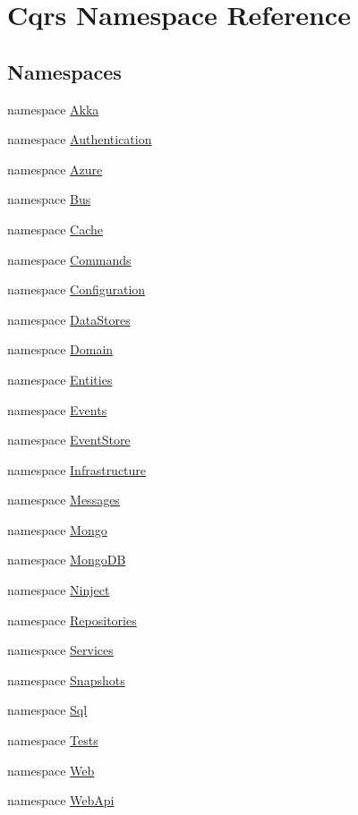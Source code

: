 \hypertarget{namespaceCqrs}{}\section{Cqrs Namespace Reference}
\label{namespaceCqrs}
\subsection*{Namespaces}
\begin{DoxyCompactItemize}
\item 
namespace \hyperlink{namespaceCqrs_1_1Akka}{Akka}
\item 
namespace \hyperlink{namespaceCqrs_1_1Authentication}{Authentication}
\item 
namespace \hyperlink{namespaceCqrs_1_1Azure}{Azure}
\item 
namespace \hyperlink{namespaceCqrs_1_1Bus}{Bus}
\item 
namespace \hyperlink{namespaceCqrs_1_1Cache}{Cache}
\item 
namespace \hyperlink{namespaceCqrs_1_1Commands}{Commands}
\item 
namespace \hyperlink{namespaceCqrs_1_1Configuration}{Configuration}
\item 
namespace \hyperlink{namespaceCqrs_1_1DataStores}{Data\+Stores}
\item 
namespace \hyperlink{namespaceCqrs_1_1Domain}{Domain}
\item 
namespace \hyperlink{namespaceCqrs_1_1Entities}{Entities}
\item 
namespace \hyperlink{namespaceCqrs_1_1Events}{Events}
\item 
namespace \hyperlink{namespaceCqrs_1_1EventStore}{Event\+Store}
\item 
namespace \hyperlink{namespaceCqrs_1_1Infrastructure}{Infrastructure}
\item 
namespace \hyperlink{namespaceCqrs_1_1Messages}{Messages}
\item 
namespace \hyperlink{namespaceCqrs_1_1Mongo}{Mongo}
\item 
namespace \hyperlink{namespaceCqrs_1_1MongoDB}{Mongo\+DB}
\item 
namespace \hyperlink{namespaceCqrs_1_1Ninject}{Ninject}
\item 
namespace \hyperlink{namespaceCqrs_1_1Repositories}{Repositories}
\item 
namespace \hyperlink{namespaceCqrs_1_1Services}{Services}
\item 
namespace \hyperlink{namespaceCqrs_1_1Snapshots}{Snapshots}
\item 
namespace \hyperlink{namespaceCqrs_1_1Sql}{Sql}
\item 
namespace \hyperlink{namespaceCqrs_1_1Tests}{Tests}
\item 
namespace \hyperlink{namespaceCqrs_1_1Web}{Web}
\item 
namespace \hyperlink{namespaceCqrs_1_1WebApi}{Web\+Api}
\end{DoxyCompactItemize}
